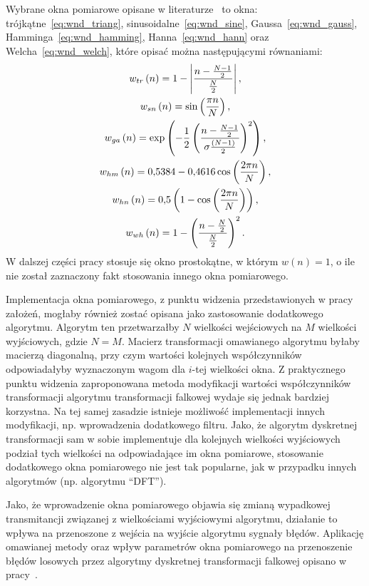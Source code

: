 Wybrane okna pomiarowe opisane w literaturze~\cite{oppenheim_dsp, oppenheim_sns, proakis_dsp} to okna: trójkątne~\eqref{eq:wnd_triang}, sinusoidalne~\eqref{eq:wnd_sine}, Gaussa~\eqref{eq:wnd_gauss}, Hamminga~\eqref{eq:wnd_hamming}, Hanna~\eqref{eq:wnd_hann} oraz Welcha~\eqref{eq:wnd_welch}, które opisać można następującymi równaniami:
\begin{gather}
w_{tr} \left(n\right) = 1 - \left| \frac{n - \frac{N-1}{2}}{\frac{N}{2}} \right| \label{eq:wnd_triang}, \\
w_{sn} \left(n\right) = \sin \left( \frac{\pi n}{N} \right) \label{eq:wnd_sine}, \\
w_{ga} \left(n\right) = \exp \left(-\frac{1}{2} \left( \frac{n - \frac{N-1}{2}}{\sigma \frac{\left(N-1\right)}{2}} \right)^{2} \right) \label{eq:wnd_gauss}, \\
w_{hm} \left(n\right) = \num{0.5384} - \num{0.4616} \cos \left( \frac{2 \pi n}{N} \right) \label{eq:wnd_hamming}, \\
w_{hn} \left(n\right) = \num{0.5} \left(1 - \cos \left( \frac{2 \pi n}{N} \right) \right) \label{eq:wnd_hann}, \\
w_{wh} \left(n\right) = 1 - \left( \frac{n - \frac{N}{2}}{\frac{N}{2}} \right)^{2} \label{eq:wnd_welch}.
\end{gather}
W dalszej części pracy stosuje się okno prostokątne, w którym $w(n) = 1$, o ile nie został zaznaczony fakt stosowania innego okna pomiarowego.

Implementacja okna pomiarowego, z punktu widzenia przedstawionych w pracy założeń, mogłaby również zostać opisana jako zastosowanie dodatkowego algorytmu. Algorytm ten przetwarzałby $N$ wielkości wejściowych na $M$ wielkości wyjściowych, gdzie $N = M$. Macierz transformacji omawianego algorytmu byłaby macierzą diagonalną, przy czym wartości kolejnych współczynników odpowiadałyby wyznaczonym wagom dla $i$-tej wielkości okna. Z praktycznego punktu widzenia zaproponowana metoda modyfikacji wartości współczynników transformacji algorytmu transformacji falkowej wydaje się jednak bardziej korzystna. Na tej samej zasadzie istnieje możliwość implementacji innych modyfikacji, np. wprowadzenia dodatkowego filtru. Jako, że algorytm dyskretnej transformacji sam w sobie implementuje dla kolejnych wielkości wyjściowych podział tych wielkości na odpowiadające im okna pomiarowe, stosowanie dodatkowego okna pomiarowego nie jest tak popularne, jak w przypadku innych algorytmów (np. algorytmu \enquote{DFT}).

Jako, że wprowadzenie okna pomiarowego objawia się zmianą wypadkowej transmitancji związanej z wielkościami wyjściowymi algorytmu, działanie to wpływa na przenoszone z wejścia na wyjście algorytmu sygnały błędów. Aplikację omawianej metody oraz wpływ parametrów okna pomiarowego na przenoszenie błędów losowych przez algorytmy dyskretnej transformacji falkowej opisano w pracy~\cite{auth_window}.

